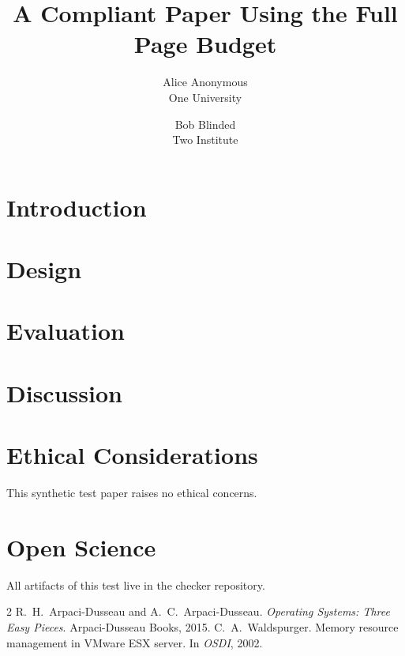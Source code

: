 \documentclass[letterpaper,twocolumn,10pt]{article}
\date{}
\title{\Large \bf A Compliant Paper Using the Full Page Budget}
\author{{\rm Alice Anonymous}\\One University \and {\rm Bob Blinded}\\Two Institute}
\begin{document}
\maketitle

\begin{abstract}
\lipsum[1][1-5]
\end{abstract}

\section{Introduction}
\lipsum[1-30]

\section{Design}
\lipsum[31-60]

\section{Evaluation}
\lipsum[61-90]

\section{Discussion}
\lipsum[91-120]

\appendix
\section*{Ethical Considerations}
This synthetic test paper raises no ethical concerns.

\section*{Open Science}
All artifacts of this test live in the checker repository.

\begin{thebibliography}{2}
 R.~H.\ Arpaci-Dusseau and A.~C.\ Arpaci-Dusseau.
  \emph{Operating Systems: Three Easy Pieces}. Arpaci-Dusseau Books, 2015.
 C.~A.\ Waldspurger. Memory resource management in VMware ESX
  server. In \emph{OSDI}, 2002.
\end{thebibliography}
\end{document}
